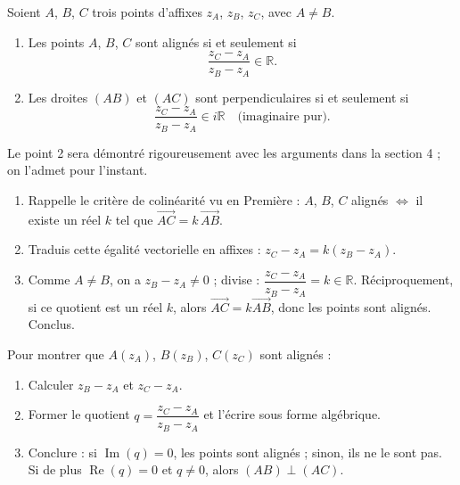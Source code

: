 \documentclass[11pt]{article}
\begin{document}
\begin{propriete}
Soient $A$, $B$, $C$ trois points d'affixes $z_A$, $z_B$, $z_C$, avec $A \neq B$.
\begin{enumerate}
\item Les points $A$, $B$, $C$ sont alignés si et seulement si
\[ \frac{z_C - z_A}{z_B - z_A} \in \mathbb{R}. \]
\item Les droites $(AB)$ et $(AC)$ sont perpendiculaires si et seulement si
\[ \frac{z_C - z_A}{z_B - z_A} \in i\mathbb{R} \quad \text{(imaginaire pur)}. \]
\end{enumerate}
Le point 2 sera démontré rigoureusement avec les arguments dans la section 4 ; on l'admet pour l'instant.
\end{propriete}

\begin{experience}
\begin{enumerate}
\item Rappelle le critère de colinéarité vu en Première : $A$, $B$, $C$ alignés $\Leftrightarrow$ il existe un réel $k$ tel que $\overrightarrow{AC} = k\,\overrightarrow{AB}$.
\item Traduis cette égalité vectorielle en affixes : $z_C - z_A = k(z_B - z_A)$.
\item Comme $A \neq B$, on a $z_B - z_A \neq 0$ ; divise : $\dfrac{z_C - z_A}{z_B - z_A} = k \in \mathbb{R}$. Réciproquement, si ce quotient est un réel $k$, alors $\overrightarrow{AC} = k\overrightarrow{AB}$, donc les points sont alignés. Conclus.
\end{enumerate}
\end{experience}

\begin{methode}
Pour montrer que $A(z_A)$, $B(z_B)$, $C(z_C)$ sont alignés :
\begin{enumerate}
\item Calculer $z_B - z_A$ et $z_C - z_A$.
\item Former le quotient $q = \dfrac{z_C - z_A}{z_B - z_A}$ et l'écrire sous forme algébrique.
\item Conclure : si $\operatorname{Im}(q) = 0$, les points sont alignés ; sinon, ils ne le sont pas. Si de plus $\operatorname{Re}(q) = 0$ et $q \neq 0$, alors $(AB) \perp (AC)$.
\end{enumerate}
\end{methode}
\end{document}
